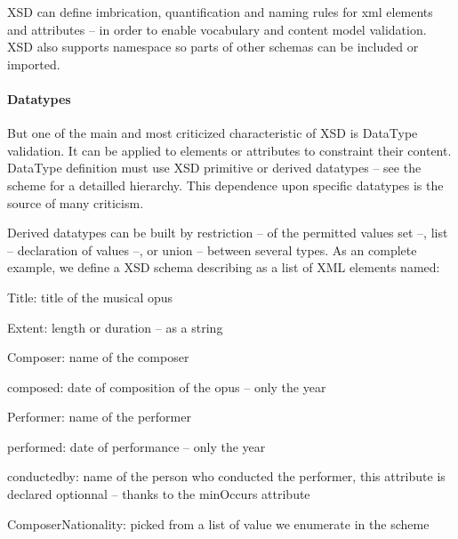 XSD can define imbrication, quantification and naming rules for xml elements and attributes – in order to enable vocabulary and content model validation. XSD also supports namespace so parts of other schemas can be included or imported. 

\paragraph{Datatypes}
But one of the main and most criticized characteristic of XSD is DataType validation. It can be applied to elements or attributes to constraint their content.  DataType definition must use XSD primitive or derived datatypes – see the scheme for a detailled hierarchy. This dependence upon specific datatypes is the source of many criticism. 

Derived datatypes can be built by restriction – of the permitted values set –, list – declaration of values –, or union – between several types. 
As an complete example, we define a XSD schema describing  as a list of XML elements named:
\begin{liste}
	\item Title: title of the musical opus
	\item Extent: length or duration – as a string
	\item Composer: name of the composer
	\item composed: date of composition of the opus – only the year
	\item Performer: name of the performer
	\item performed: date of performance – only the year
	\item conductedby: name of the person who conducted the performer, this attribute is declared optionnal – thanks to the minOccurs attribute
	\item ComposerNationality: picked from a list of value we enumerate in the scheme
\end{liste}

